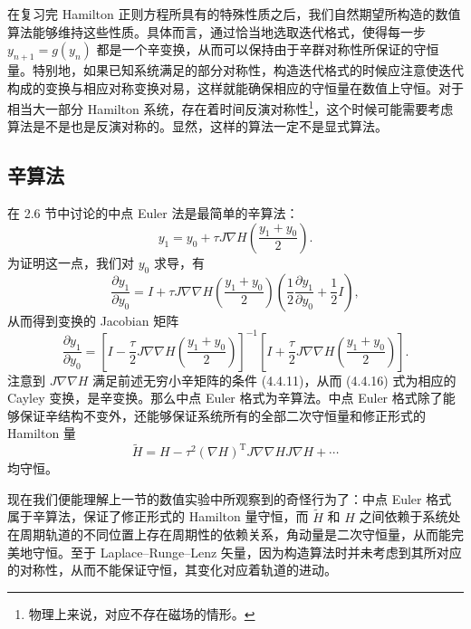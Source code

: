 在复习完 Hamilton 正则方程所具有的特殊性质之后，我们自然期望所构造的数值算法能够维持这些性质。具体而言，通过恰当地选取迭代格式，使得每一步 $y_{n+1}=g(y_n)$ 都是一个辛变换，从而可以保持由于辛群对称性所保证的守恒量。特别地，如果已知系统满足的部分对称性，构造迭代格式的时候应注意使迭代构成的变换与相应对称变换对易，这样就能确保相应的守恒量在数值上守恒。对于相当大一部分 Hamilton 系统，存在着时间反演对称性\footnote{物理上来说，对应不存在磁场的情形。}，这个时候可能需要考虑算法是不是也是反演对称的。显然，这样的算法一定不是显式算法。

\subsection{辛算法}

在 2.6 节中讨论的中点 Euler 法是最简单的辛算法：
\begin{equation}
 y_1=y_0+\tau J\nabla H\left(\frac{y_1+y_0}{2}\right).
\tag{4.4.14}
\end{equation}
为证明这一点，我们对 $y_0$ 求导，有
\begin{equation}
\frac{\partial y_1}{\partial y_0}
=I+\tau J\nabla\nabla H\left(\frac{y_1+y_0}{2}\right)
\left(\frac12\frac{\partial y_1}{\partial y_0}+\frac12I\right),
\tag{4.4.15}
\end{equation}
从而得到变换的 Jacobian 矩阵
\begin{equation}
\frac{\partial y_1}{\partial y_0}
=\left[I-\frac\tau2J\nabla\nabla H\left(\frac{y_1+y_0}{2}\right)\right]^{-1}
\left[I+\frac\tau2J\nabla\nabla H\left(\frac{y_1+y_0}{2}\right)\right].
\tag{4.4.16}
\end{equation}
注意到 $J\nabla\nabla H$ 满足前述无穷小辛矩阵的条件 (4.4.11)，从而 (4.4.16) 式为相应的 Cayley 变换，是辛变换。那么中点 Euler 格式为辛算法。中点 Euler 格式除了能够保证辛结构不变外，还能够保证系统所有的全部二次守恒量和修正形式的 Hamilton 量
\[
\widetilde H=H-\tau^2(\nabla H)^{\mathrm T}J\nabla\nabla HJ\nabla H+\cdots
\]
均守恒。

现在我们便能理解上一节的数值实验中所观察到的奇怪行为了：中点 Euler 格式属于辛算法，保证了修正形式的 Hamilton 量守恒，而 $\widetilde H$ 和 $H$ 之间依赖于系统处在周期轨道的不同位置上存在周期性的依赖关系，角动量是二次守恒量，从而能完美地守恒。至于 Laplace--Runge--Lenz 矢量，因为构造算法时并未考虑到其所对应的对称性，从而不能保证守恒，其变化对应着轨道的进动。


